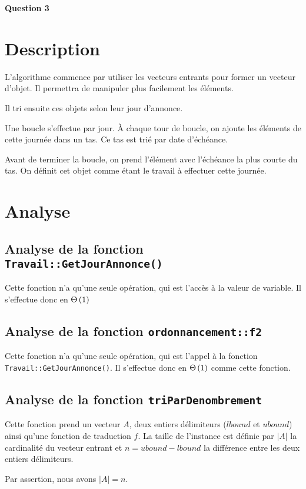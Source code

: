 \documentclass[class=article]{standalone}
\begin{document}
\centerline{\Huge \bf Question 3}
\bigskip

\section*{Description}
L'algorithme commence par utiliser les vecteurs entrants pour former un vecteur d'objet. 
Il permettra de manipuler plus facilement les éléments.

Il tri ensuite ces objets selon leur jour d'annonce.

Une boucle s'effectue par jour. À chaque tour de boucle, on ajoute les éléments de cette journée dans un tas.
Ce tas est trié par date d'échéance.

Avant de terminer la boucle, on prend l'élément avec l'échéance la plus courte du tas. 
On définit cet objet comme étant le travail à effectuer cette journée.

\section*{Analyse}

\subsection*{Analyse de la fonction \lstinline{Travail::GetJourAnnonce()}}
Cette fonction n'a qu'une seule opération, qui est l'accès à la valeur de variable.
Il s'effectue donc en $\Theta\left ( 1 \right )$

\subsection*{Analyse de la fonction \lstinline{ordonnancement::f2}}
Cette fonction n'a qu'une seule opération, qui est l'appel à la fonction \lstinline{Travail::GetJourAnnonce()}.
Il s'effectue donc en $\Theta\left ( 1 \right )$ comme cette fonction.

\subsection*{Analyse de la fonction \lstinline{triParDenombrement}}
Cette fonction prend un vecteur $A$, deux entiers délimiteurs ($lbound$ et $ubound$) ainsi qu'une fonction de traduction $f$.
La taille de l'instance est définie par $|A|$ la cardinalité du vecteur entrant et $n = ubound - lbound$ la différence entre
les deux entiers délimiteurs.

Par assertion, nous avons $|A| = n$.
\end{document}
